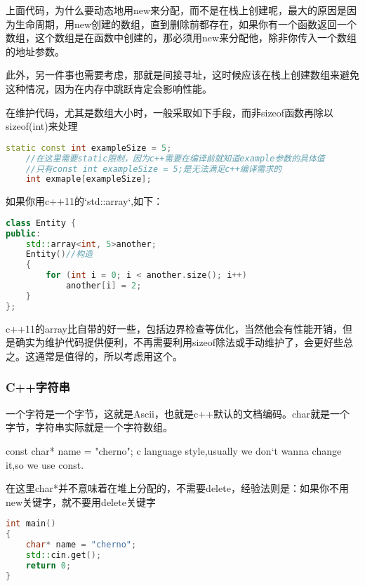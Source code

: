 上面代码，为什么要动态地用{\ncodestyle new}来分配，而不是在栈上创建呢，最大的原因是因为生命周期，用{\ncodestyle new}创建的数组，直到删除前都存在，如果你有一个函数返回一个数组，这个数组是在函数中创建的，那必须用{\ncodestyle new}来分配他，除非你传入一个数组的地址参数。

此外，另一件事也需要考虑，那就是间接寻址，这时候应该在栈上创建数组来避免这种情况，因为在内存中跳跃肯定会影响性能。

在维护代码，尤其是数组大小时，一般采取如下手段，而非{\ncodestyle sizeof}函数再除以{\ncodestyle sizeof(int)}来处理

\begin{lstlisting}[language=c++]
    static const int exampleSize = 5;
    //在这里需要static限制，因为c++需要在编译前就知道example参数的具体值
    //只有const int exampleSize = 5;是无法满足c++编译需求的
    int exmaple[exampleSize];
\end{lstlisting}


如果你用c++11的`std::array`,如下：

\begin{lstlisting}[language=c++]
class Entity {
public:
    std::array<int, 5>another;
    Entity()//构造
    {
        for (int i = 0; i < another.size(); i++)
            another[i] = 2;
    }
};
\end{lstlisting}

c++11的array比自带的好一些，包括边界检查等优化，当然他会有性能开销，但是确实为维护代码提供便利，不再需要利用{\ncodestyle sizeof}除法或手动维护了，会更好些总之。这通常是值得的，所以考虑用这个。

\subsubsection{C++字符串}

一个字符是一个字节，这就是Ascii，也就是c++默认的文档编码。{\ncodestyle char}就是一个字节，字符串实际就是一个字符数组。

{\ncodestyle const char* name = "cherno";}
c language style,usually we don`t wanna change it,so we use const.

在这里{\ncodestyle char*}并不意味着在堆上分配的，不需要{\ncodestyle delete}，经验法则是：如果你不用{\ncodestyle new}关键字，就不要用{\ncodestyle delete}关键字


\begin{lstlisting}[language=c++]
int main()
{
    char* name = "cherno";
    std::cin.get();
    return 0;
}
\end{lstlisting}


